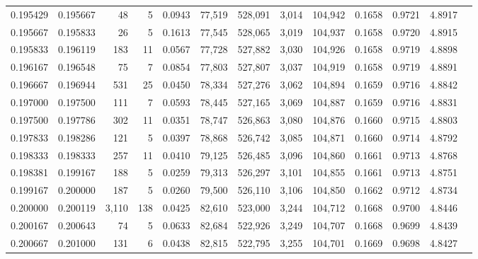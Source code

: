 \begin{tabular}{rrrrrrrrrrrrr}
0.195429 & 0.195667 &    48 &   5 &                                     0.0943 &  77,519 & 528,091 &   3,014 & 104,942 & 0.1658 & 0.9721 & 4.8917 \\
0.195667 & 0.195833 &    26 &   5 &                                     0.1613 &  77,545 & 528,065 &   3,019 & 104,937 & 0.1658 & 0.9720 & 4.8915 \\
0.195833 & 0.196119 &   183 &  11 &                                     0.0567 &  77,728 & 527,882 &   3,030 & 104,926 & 0.1658 & 0.9719 & 4.8898 \\
0.196167 & 0.196548 &    75 &   7 &                                     0.0854 &  77,803 & 527,807 &   3,037 & 104,919 & 0.1658 & 0.9719 & 4.8891 \\
0.196667 & 0.196944 &   531 &  25 &                                     0.0450 &  78,334 & 527,276 &   3,062 & 104,894 & 0.1659 & 0.9716 & 4.8842 \\
0.197000 & 0.197500 &   111 &   7 &                                     0.0593 &  78,445 & 527,165 &   3,069 & 104,887 & 0.1659 & 0.9716 & 4.8831 \\
0.197500 & 0.197786 &   302 &  11 &                                     0.0351 &  78,747 & 526,863 &   3,080 & 104,876 & 0.1660 & 0.9715 & 4.8803 \\
0.197833 & 0.198286 &   121 &   5 &                                     0.0397 &  78,868 & 526,742 &   3,085 & 104,871 & 0.1660 & 0.9714 & 4.8792 \\
0.198333 & 0.198333 &   257 &  11 &                                     0.0410 &  79,125 & 526,485 &   3,096 & 104,860 & 0.1661 & 0.9713 & 4.8768 \\
0.198381 & 0.199167 &   188 &   5 &                                     0.0259 &  79,313 & 526,297 &   3,101 & 104,855 & 0.1661 & 0.9713 & 4.8751 \\
0.199167 & 0.200000 &   187 &   5 &                                     0.0260 &  79,500 & 526,110 &   3,106 & 104,850 & 0.1662 & 0.9712 & 4.8734 \\
0.200000 & 0.200119 & 3,110 & 138 &                                     0.0425 &  82,610 & 523,000 &   3,244 & 104,712 & 0.1668 & 0.9700 & 4.8446 \\
0.200167 & 0.200643 &    74 &   5 &                                     0.0633 &  82,684 & 522,926 &   3,249 & 104,707 & 0.1668 & 0.9699 & 4.8439 \\
0.200667 & 0.201000 &   131 &   6 &                                     0.0438 &  82,815 & 522,795 &   3,255 & 104,701 & 0.1669 & 0.9698 & 4.8427 \\

\end{tabular}
